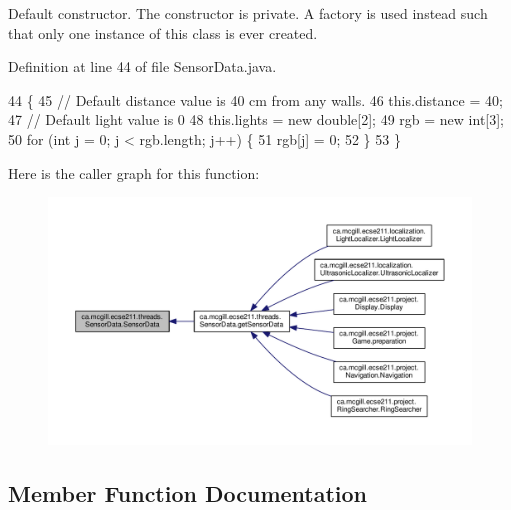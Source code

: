 Default constructor. The constructor is private. A factory is used instead such that only one instance of this class is ever created. 

Definition at line 44 of file Sensor\+Data.\+java.


\begin{DoxyCode}
44                          \{
45     \textcolor{comment}{// Default distance value is 40 cm from any walls.}
46     this.distance = 40;
47     \textcolor{comment}{// Default light value is 0}
48     this.lights = \textcolor{keyword}{new} \textcolor{keywordtype}{double}[2];
49     rgb = \textcolor{keyword}{new} \textcolor{keywordtype}{int}[3];
50     \textcolor{keywordflow}{for} (\textcolor{keywordtype}{int} j = 0; j < rgb.length; j++) \{
51       rgb[j] = 0;
52     \}
53   \}
\end{DoxyCode}
Here is the caller graph for this function\+:\nopagebreak
\begin{figure}[H]
\begin{center}
\leavevmode
\includegraphics[width=350pt]{classca_1_1mcgill_1_1ecse211_1_1threads_1_1_sensor_data_a11dcdc9c15184e05a9c84fc3958e26b6_icgraph}
\end{center}
\end{figure}


\subsection{Member Function Documentation}
\mbox{\label{classca_1_1mcgill_1_1ecse211_1_1threads_1_1_sensor_data_acc8f6cc56f39c8ea6b812cd8b135eca6}} 
